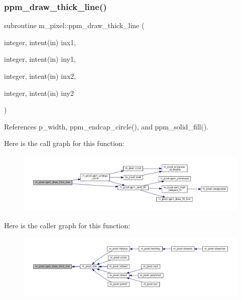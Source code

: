 \subsubsection{\texorpdfstring{ppm\+\_\+draw\+\_\+thick\+\_\+line()}{ppm\_draw\_thick\_line()}}
{\footnotesize\ttfamily subroutine m\+\_\+pixel\+::ppm\+\_\+draw\+\_\+thick\+\_\+line (\begin{DoxyParamCaption}\item[{integer, intent(in)}]{inx1,  }\item[{integer, intent(in)}]{iny1,  }\item[{integer, intent(in)}]{inx2,  }\item[{integer, intent(in)}]{iny2 }\end{DoxyParamCaption})\hspace{0.3cm}{\ttfamily [private]}}



References p\+\_\+width, ppm\+\_\+endcap\+\_\+circle(), and ppm\+\_\+solid\+\_\+fill().

Here is the call graph for this function\+:
\nopagebreak
\begin{figure}[H]
\begin{center}
\leavevmode
\includegraphics[width=350pt]{namespacem__pixel_a1629b7134d0ea4b0f301ca23df764b8e_cgraph}
\end{center}
\end{figure}
Here is the caller graph for this function\+:
\nopagebreak
\begin{figure}[H]
\begin{center}
\leavevmode
\includegraphics[width=350pt]{namespacem__pixel_a1629b7134d0ea4b0f301ca23df764b8e_icgraph}
\end{center}
\end{figure}
\mbox{\label{namespacem__pixel_aede24c612504a3e416840e6242c2d8fb}} 
